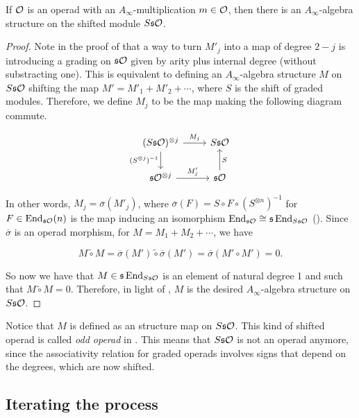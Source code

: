 \documentclass[join.tex]{subfiles}
\begin{document}
\begin{propo}\label{ainftystructure}
If ${\mathcal O}$ is an operad with an $A_\infty$-multiplication $m\in{\mathcal O}$, then there is an $A_\infty$-algebra structure on the shifted module $S\mathfrak{s}{\mathcal O}$. 
\end{propo}
\begin{proof}
Note in the proof of  that a way to turn $M'_j$ into a map of degree $2-j$ is introducing a grading on $\mathfrak{s}{\mathcal O}$ given by arity plus internal degree (without substracting one). This is equivalent to defining an $A_\infty$-algebra structure $M$ on $S\mathfrak{s}{\mathcal O}$ shifting the map $M'=M'_1+M'_2+\cdots$, where $S$ is the shift of graded modules. Therefore, we define $M_j$ to be the map making the following diagram commute.

\[
\begin{tikzcd}
(S\s\OO)^{\otimes j}\arrow[r,"M_j"]\arrow[d, "(S^{\otimes j})^{-1}"'] & S\s\OO\\
\s\OO^{\otimes j}\arrow[r, "M'_j"] & \s\OO\arrow[u,"S"']
\end{tikzcd}
\]

In other words, $M_j=\overline{\sigma}(M'_j)$, where $\overline{\sigma}(F)=S\circ F\circ (S^{\otimes n})^{-1}$ for $F\in\operatorname{End}_{\mathfrak{s}{\mathcal O}}(n)$ is the map inducing an isomorphism $\operatorname{End}_{\mathfrak{s}{\mathcal O}}\cong \mathfrak{s}\operatorname{End}_{S\mathfrak{s}{\mathcal O}}$ (). Since $\overline{\sigma}$ is an operad morphism, for $M=M_1+M_2+\cdots$, we have

\[
M\tilde{\circ}M=\overline{\sigma}(M')\tilde{\circ}\overline{\sigma}(M')=\overline{\sigma}(M'\circ M')=0.
\]

So now we have that $M\in\mathfrak{s}\operatorname{End}_{S\mathfrak{s}{\mathcal O}}$ is an element of natural degree 1 and such that $M\tilde\circ M=0$. Therefore, in light of , $M$ is the desired $A_\infty$-algebra structure on $S\mathfrak{s}{\mathcal O}$. 
\end{proof}
Notice that $M$ is defined as an structure map on $S\mathfrak{s}{\mathcal O}$. This kind of shifted operad is called \emph{odd operad} in \cite{ward}. This means that $S\mathfrak{s}{\mathcal O}$ is not an operad anymore, since the associativity relation for graded operads involves signs that depend on the degrees, which are now shifted. 

\subsection{Iterating the process}\label{sect3}
\end{document}
